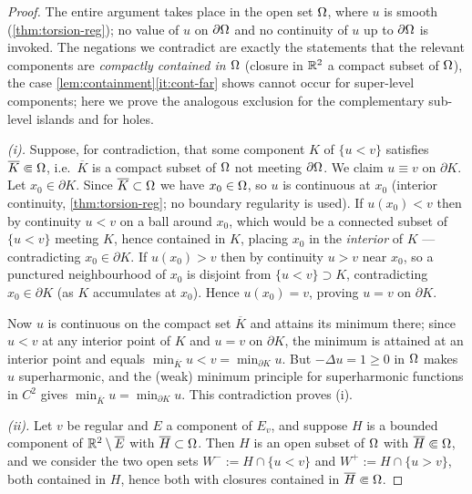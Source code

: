 \begin{proof}
The entire argument takes place in the open set $\Omega$, where $u$ is smooth
(\cref{thm:torsion-reg}); no value of $u$ on $\partial\Omega$ and no continuity
of $u$ up to $\partial\Omega$ is invoked. The negations we contradict are
exactly the statements that the relevant components are \emph{compactly
contained in $\Omega$} (closure in $\mathbb{R}^2$ a compact subset of $\Omega$), the case
\cref{lem:containment}\ref{it:cont-far} shows cannot occur for super-level
components; here we prove the analogous exclusion for the complementary
sub-level islands and for holes.

\emph{(i).} Suppose, for contradiction, that some component $K$ of
$\{u<v\}$ satisfies $\overline K\Subset\Omega$, i.e.\ $\overline K$ is a compact
subset of $\Omega$ not meeting $\partial\Omega$. We claim $u\equiv v$ on
$\partial K$. Let $x_0\in\partial K$. Since $\overline K\subset\Omega$ we have
$x_0\in\Omega$, so $u$ is continuous at $x_0$ (interior continuity,
\cref{thm:torsion-reg}; no boundary regularity is used). If $u(x_0)<v$ then by continuity
$u<v$ on a ball around $x_0$, which would be a connected subset of
$\{u<v\}$ meeting $K$, hence contained in $K$, placing $x_0$ in the
\emph{interior} of $K$ --- contradicting $x_0\in\partial K$. If $u(x_0)>v$
then by continuity $u>v$ near $x_0$, so a punctured neighbourhood of $x_0$
is disjoint from $\{u<v\}\supset K$, contradicting $x_0\in\partial K$ (as
$K$ accumulates at $x_0$). Hence $u(x_0)=v$, proving $u=v$ on $\partial K$.

Now $u$ is continuous on the compact set $\overline K$ and attains its
minimum there; since $u<v$ at any interior point of $K$ and $u=v$ on
$\partial K$, the minimum is attained at an interior point and equals
$\min_{\overline K}u<v=\min_{\partial K}u$. But $-\Delta u=1\ge0$ in $\Omega$
makes $u$ superharmonic, and the (weak) minimum principle for
superharmonic functions in $C^2$
\cite[Theorem~3.1]{GilbargTrudinger2001} gives
$\min_{\overline K}u=\min_{\partial K}u$. This contradiction proves (i).

\emph{(ii).} Let $v$ be regular and $E$ a component of $E_v$, and suppose
$H$ is a bounded component of $\mathbb{R}^2\setminus\overline E$ with
$\overline H\subset\Omega$. Then $H$ is an open subset of $\Omega$ with
$\overline H\Subset\Omega$, and we consider the two open sets
$W^-:=H\cap\{u<v\}$ and $W^+:=H\cap\{u>v\}$, both contained in $H$, hence
both with closures contained in $\overline H\Subset\Omega$.


\end{proof}
